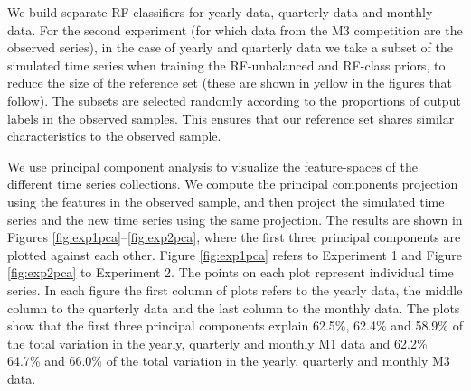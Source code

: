 \documentclass[11pt,a4paper,]{article}
\begin{document}
We build separate RF classifiers for yearly data, quarterly data and monthly data. For the second experiment (for which data from the M3 competition are the observed series), in the case of yearly and quarterly data we take a subset of the simulated time series when training the RF-unbalanced and RF-class priors, to reduce the size of the reference set (these are shown in yellow in the figures that follow). The subsets are selected randomly according to the proportions of output labels in the observed samples. This ensures that our reference set shares similar characteristics to the observed sample.

We use principal component analysis to visualize the feature-spaces of the different time series collections. We compute the principal components projection using the features in the observed sample, and then project the simulated time series and the new time series using the same projection. The results are shown in Figures \ref{fig:exp1pca}--\ref{fig:exp2pca}, where the first three principal components are plotted against each other. Figure \ref{fig:exp1pca} refers to Experiment 1 and Figure \ref{fig:exp2pca} to Experiment 2. The points on each plot represent individual time series. In each figure the first column of plots refers to the yearly data, the middle column to the quarterly data and the last column to the monthly data. The plots show that the first three principal components explain 62.5\%, 62.4\% and 58.9\% of the total variation in the yearly, quarterly and monthly M1 data and 62.2\% 64.7\% and 66.0\% of the total variation in the yearly, quarterly and monthly M3 data.
\end{document}
